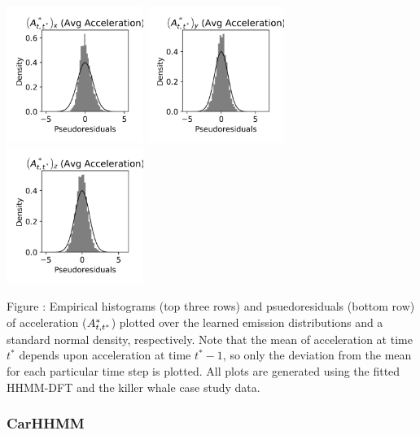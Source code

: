 \documentclass{article}
\begin{document}
\begin{center}
        \includegraphics[width=1.75in]{../Plots/HHMM_psedoresids_Ax.png}
        \includegraphics[width=1.75in]{../Plots/HHMM_psedoresids_Ay.png}
        \includegraphics[width=1.75in]{../Plots/HHMM_psedoresids_Az.png}
        \end{center}
        
        \noindent Figure : Empirical histograms (top three rows) and psuedoresiduals (bottom row) of acceleration ($A^*_{t,t^*}$) plotted over the learned emission distributions and a standard normal density, respectively. Note that the mean of acceleration at time $t^*$ depends upon acceleration at time $t^*-1$, so only the deviation from the mean for each particular time step is plotted. All plots are generated using the fitted HHMM-DFT and the killer whale case study data.
        \addtocounter{fignum}{1}
        
        \newpage
        
        \subsubsection{CarHHMM}
        
\end{document}
